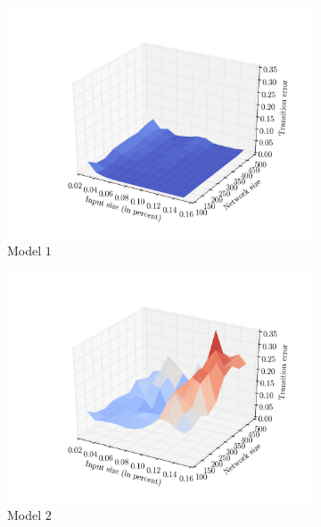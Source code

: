 \begin{figure}[p]
    \centering
    \begin{subfigure}{0.48\textwidth}
    	\centering
        \includegraphics[width=\textwidth]{results/mc1_distances_size_inputs_0}
        \caption{Model $1$}
        \label{fig:mc1-size-0}
    \end{subfigure}
    \hfill
    \begin{subfigure}{0.48\textwidth}
    	\centering
        \includegraphics[width=\textwidth]{results/mc1_distances_size_inputs_1}
        \caption{Model $2$}
        \label{fig:mc1-size-1}
    \end{subfigure}
    \begin{subfigure}{0.48\textwidth}

\end{subfigure}
\end{figure}
